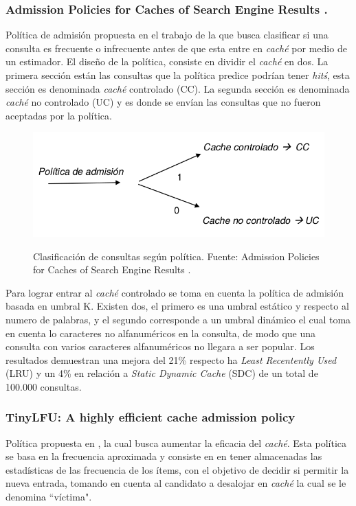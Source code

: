 \documentclass[12pt]{ociamthesis}  %
\begin{document}
\subsubsection{Admission Policies for Caches of Search Engine Results \cite{baeza2007admission}.}

Política de admisión propuesta en el trabajo de \cite{baeza2007admission} la que busca clasificar si una consulta es frecuente o infrecuente antes de que esta entre en \textit{caché} por medio de un estimador. El diseño de la política, consiste en dividir el \textit{caché} en dos. La primera sección están las consultas que la política predice podrían tener \textit{hitś}, esta sección es denominada \textit{caché} controlado (CC). La segunda sección es denominada \textit{caché} no controlado (UC) y es donde se envían las consultas que no fueron aceptadas por la política. 

\begin{figure}[!htb]
	\centering
	\includegraphics[width=12cm]{Imagenes/PoliticaAdmi_cache_CC_UC}\\
	\caption{Clasificación de consultas según política. Fuente: Admission Policies for Caches of Search Engine Results \cite{baeza2007admission}.}
	\label{clasificacion_consulta_cc_uc}
\end{figure}

Para lograr entrar al \textit{caché} controlado se toma en cuenta la política de admisión basada en umbral K. Existen dos, el primero es una umbral estático y respecto al numero de palabras, y el segundo corresponde a un umbral dinámico el cual toma en cuenta lo caracteres no alfanuméricos en la consulta, de modo que una consulta con varios caracteres alfanuméricos no llegara a ser popular. Los resultados demuestran una mejora del 21\% respecto ha \textit{Least Recentently Used} (LRU) y un 4\% en relación a \textit{Static Dynamic Cache} (SDC) de un total de 100.000 consultas.\\

\clearpage


\subsubsection{TinyLFU: A highly efficient cache admission policy}
Política propuesta en \cite{einziger2014tinylfu}, la cual busca aumentar la eficacia del \textit{caché}. Esta política se basa en la frecuencia aproximada y consiste en en tener almacenadas las estadísticas de las frecuencia de los ítems, con el objetivo de decidir si permitir la nueva entrada, tomando en cuenta al candidato a desalojar en \textit{caché} la cual se le denomina ``víctima".\\
\end{document}
